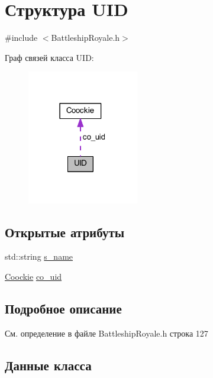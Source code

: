 \hypertarget{struct_u_i_d}{}\section{Структура U\+ID}
\label{struct_u_i_d}


{\ttfamily \#include $<$Battleship\+Royale.\+h$>$}



Граф связей класса U\+ID\+:
\nopagebreak
\begin{figure}[H]
\begin{center}
\leavevmode
\includegraphics[width=138pt]{struct_u_i_d__coll__graph}
\end{center}
\end{figure}
\subsection*{Открытые атрибуты}
\begin{DoxyCompactItemize}
\item 
std\+::string \mbox{\hyperlink{struct_u_i_d_ad126ab7d56812c322727617b427068ad}{s\+\_\+name}}
\item 
\mbox{\hyperlink{struct_coockie}{Coockie}} \mbox{\hyperlink{struct_u_i_d_acf7ef2a71d9a80e890f911425e46d7f0}{co\+\_\+uid}}
\end{DoxyCompactItemize}


\subsection{Подробное описание}


См. определение в файле Battleship\+Royale.\+h строка 127



\subsection{Данные класса}
\mbox{\label{struct_u_i_d_acf7ef2a71d9a80e890f911425e46d7f0}} 
